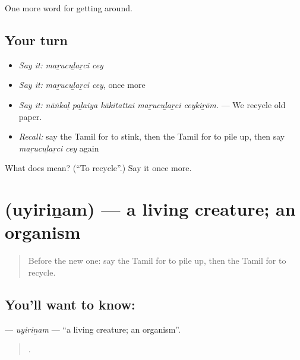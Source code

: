 \begin{grammarlens}[title={What you've built}]
One more word for getting around.
\end{grammarlens}

\subsection*{Your turn}
\begin{itemize}
\raggedright
  \item \emph{Say it:} \emph{maṟucuḻaṟci cey}
  \item \emph{Say it:} \emph{maṟucuḻaṟci cey}, once more
  \item \emph{Say it:} \emph{nāṅkaḷ paḻaiya kākitattai maṟucuḻaṟci ceykiṟōm.} — We recycle old paper.
  \item \emph{Recall:} say the Tamil for to stink, then the Tamil for to pile up, then say \emph{maṟucuḻaṟci cey} again
\end{itemize}

\begin{tcolorbox}[breakable,colback=teal!4,colframe=teal!35!black,title={Before you move on}]
What does   mean? (\textquotedblleft{}To recycle\textquotedblright{}.) Say it once more.
\end{tcolorbox}
\section[\texorpdfstring{\ta{உயிரினம்} (uyiriṉam)}{உயிரினம் (uyiriṉam)}]{ (uyiriṉam) — a living creature; an organism}

\label{lesson:TA-C441-uyirinam}



\begin{quote}
Before the new one: say the Tamil for to pile up, then the Tamil for to recycle.
\end{quote}

\subsection*{You'll want to know: }
\textbf{} — \emph{uyiriṉam} — \textquotedblleft{}a living creature; an organism\textquotedblright{}.

\begin{quote}
    .
\end{quote}

